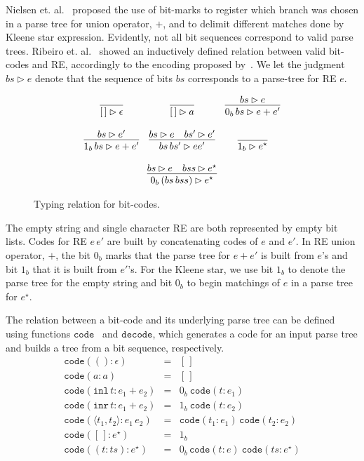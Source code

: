 \documentclass[oneside,12pt]{scrbook}
\theoremstyle{definition}
\newcommand{\inl}{\ensuremath{\texttt{inl}}}
\newcommand{\inr}{\ensuremath{\texttt{inr}}}
\newcommand{\code}{\ensuremath{\texttt{code}}}
\newcommand{\decodee}{\ensuremath{\texttt{decode}}}
\theoremstyle{plain}
\theoremstyle{definition}
\begin{document}
Nielsen et. al.~\cite{Lasse2011} proposed the
use of bit-marks to register which branch was chosen in a parse tree for union
operator, $+$, and to delimit different matches done by Kleene star expression.
Evidently, not all bit sequences correspond to valid parse trees. Ribeiro et. al.~\cite{Ribeiro2017}
showed an inductively defined relation between valid bit-codes and RE, accordingly to the encoding
proposed by~\cite{Lasse2011}. We let the judgment $bs \rhd e$ denote that the sequence of bits
$bs$ corresponds to a parse-tree for RE $e$.

\begin{figure}[h]
	\[
	\begin{array}{ccc}
	\infer{[\,] \rhd \epsilon}{} &
	\infer{[\,] \rhd a}{}  &
	\infer{0_b\, bs \rhd e + e'}{bs \rhd e} \\ \\
	\infer{1_b\,bs \rhd e + e'}{bs \rhd e'} &
	\infer{bs\,bs' \rhd e e'}{bs \rhd e & bs' \rhd e'} &
	\infer{ 1_b \rhd e^\star}{} \\ \\
	\multicolumn{3}{c}{
		\infer{0_b\,(bs\,bss) \rhd e^\star}{bs \rhd e & bss \rhd e^\star}
	}
	\end{array}
	\]
	\centering
	\caption{Typing relation for bit-codes.}
	\label{figure:typing-bitcodes}
\end{figure}

The empty string and single character RE are both represented by empty bit lists. Codes for RE $e\,e'$ are
built by concatenating codes of $e$ and $e'$. In RE union operator, $+$, the bit $0_b$ marks that the
parse tree for $e + e'$ is built from $e$'s and bit $1_b$ that it is built from $e'$'s. For the Kleene
star, we use bit $1_b$ to denote the parse tree for the empty string and bit $0_b$ to begin matchings of $e$
in a parse tree for $e^\star$.

The relation between a bit-code and its underlying parse tree can be defined using functions
\code~ and \decodee, which generates a code for an input parse tree and builds a tree from a bit sequence, 
respectively. 
\[
\begin{array}{lcl}
\code (() : \epsilon) & = & [\,]\\
\code (a : a)         & = & [\,]\\
\code (\inl\,t : e_1 + e_2) & = & 0_b\:\code(t : e_1)\\ 
\code (\inr\,t : e_1 + e_2) & = & 1_b\:\code(t : e_2)\\
\code (\langle t_1, t_2\rangle : e_1\,e_2) & = & \code (t_1 : e_1)\,\code(t_2 : e_2)\\
\code ([\,] : e^\star) & = & 1_b\\
\code ((t : ts) : e^\star) & = & 0_b\,\code (t : e)\:\code(ts : e^\star)\\ 
\end{array}
\]
\end{document}
